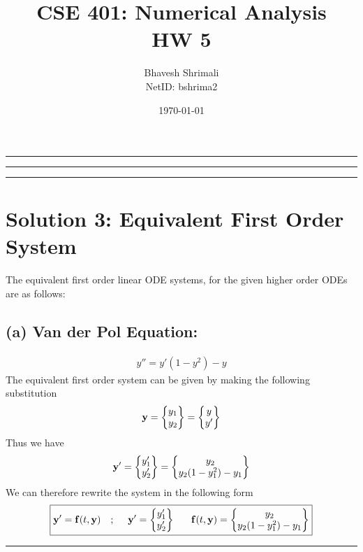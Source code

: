 
\title{\bf CSE 401: Numerical Analysis \\ HW 5}
\author{Bhavesh Shrimali \\ NetID: bshrima2}
\date{\today}
\titlespacing*{\title}{-2ex}{*-2ex}{-2ex}

\maketitle \hrule \hrule \hrule
\section*{Solution 3: Equivalent First Order System}
The equivalent first order linear ODE systems, for the given higher order ODEs are as follows: 
\subsection*{(a) Van der Pol Equation:}
\begin{align*}
y'' = y'(1-y^2) - y
\end{align*}
The equivalent first order system can be given by making the following substitution 
\begin{align*}
{\bf y} = 
\begin{Bmatrix}
y_1 \\
y_2
\end{Bmatrix}
=
\begin{Bmatrix}
y \\
y'
\end{Bmatrix}
\end{align*}
Thus we have 
\begin{align*}
{\bf y}'
=
\begin{Bmatrix}
y'_1\\y'_2
\end{Bmatrix}
=
\begin{Bmatrix}
y_2\\y_2(1-y^2_1)-y_1
\end{Bmatrix}
\end{align*}
We can therefore rewrite the system in the following form 
\begin{align*}
\boxed{
{\bf y}' = {\bf f}(t,{\bf y})\ \ \ ; \ \ \ \ {\bf y}' = \begin{Bmatrix}
y'_1\\y'_2
\end{Bmatrix}
\ \ \ \ \ {\bf f}(t,{\bf y}) = \begin{Bmatrix}
y_2\\y_2(1-y^2_1)-y_1
\end{Bmatrix}
}
\end{align*} \hrule
